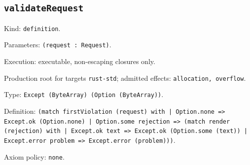 \documentclass[11pt]{article}
\begin{document}
\subsection*{\texttt{validateRequest}}
\noindent Kind: \texttt{definition}.\par
\noindent Parameters: \texttt{(request : Request)}.\par
\noindent Execution: executable, non-escaping closures only.\par
\noindent Production root for targets \texttt{rust-std}; admitted effects: \texttt{allocation, overflow}.\par
\noindent Type: \texttt{Except (ByteArray) (Option (ByteArray))}.\par
\noindent Definition: \texttt{(match firstViolation (request) with | Option.none => Except.ok (Option.none) | Option.some rejection => (match render (rejection) with | Except.ok text => Except.ok (Option.some (text)) | Except.error problem => Except.error (problem)))}.\par
\noindent Axiom policy: \texttt{none}.\par
\end{document}

